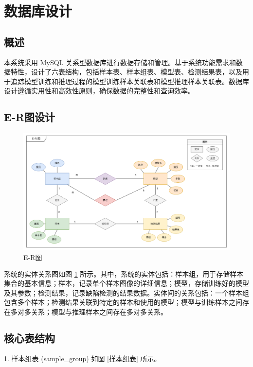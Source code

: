 \documentclass[
  ]{njuthesis}
\begin{document}
\section{数据库设计}

\subsection{概述}

本系统采用 MySQL 关系型数据库进行数据存储和管理。基于系统功能需求和数据特性，设计了六表结构，包括样本表、样本组表、模型表、检测结果表，以及用于追踪模型训练和推理过程的模型训练样本关联表和模型推理样本关联表。数据库设计遵循实用性和高效性原则，确保数据的完整性和查询效率。

\subsection{E-R图设计}

\begin{figure}[H]
    \centering
    \includegraphics[width=\textwidth]{images/E-R图.png}
    \caption{E-R图}
    \label{E-R图}
\end{figure}

系统的实体关系图如图 \ref{E-R图} 所示。其中，系统的实体包括：样本组，用于存储样本集合的基本信息；样本，记录单个样本图像的详细信息；模型，存储训练好的模型及其参数；检测结果，记录缺陷检测的结果数据。实体间的关系包括：一个样本组包含多个样本；检测结果关联到特定的样本和使用的模型；模型与训练样本之间存在多对多关系；模型与推理样本之间存在多对多关系。

\subsection{核心表结构}

1. 样本组表 (sample\_group) 如图 \ref{样本组表} 所示。
\end{document}
